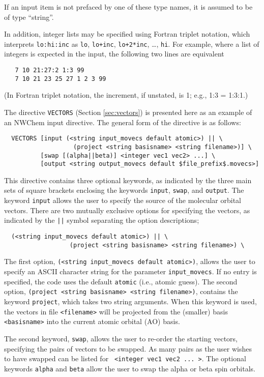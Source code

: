 If an input item is not prefaced by one of these type names,
it is assumed to be of type ``string''.

In addition, integer lists may be specified using Fortran triplet
notation, which interprets \verb+lo:hi:inc+ as \verb+lo+, \verb=lo+inc=,
\verb=lo+2*inc=, \ldots, \verb+hi+.  For example, where a list of
integers is expected in the input, the following two lines are
equivalent
\begin{verbatim}
   7 10 21:27:2 1:3 99
   7 10 21 23 25 27 1 2 3 99
\end{verbatim}
(In Fortran triplet notation,  the increment, if unstated, is 1; e.g., 1:3 = 1:3:1.)
 
The directive \verb+VECTORS+ (Section \ref{sec:vectors}) is presented here
as an example of an NWChem input directive.  The general form of the
directive is as follows:
\begin{verbatim}
  VECTORS [input (<string input_movecs default atomic>) || \
                   (project <string basisname> <string filename>)] \
          [swap [(alpha||beta)] <integer vec1 vec2> ...] \
          [output <string output_movecs default $file_prefix$.movecs>]
\end{verbatim}

This directive contains three optional keywords, as indicated by the 
three main sets of square brackets enclosing the keywords \verb+input+,
\verb+swap+, and \verb+output+.  The keyword \verb+input+ allows the
user to specify the source of the molecular orbital vectors.  
There are two mutually exclusive options for
specifying the vectors, as indicated by the \verb+||+ symbol
separating the option descriptions;
\begin{verbatim}
  (<string input_movecs default atomic>) || \
                  (project <string basisname> <string filename>) \
\end{verbatim}

The first option, \verb+(<string input_movecs default atomic>)+,
allows the user to specify an ASCII character string for the parameter
{\tt input\_movecs}.  If no entry is specified, the code uses the
default \verb+atomic+ (i.e., atomic guess).  The second option,
{\tt(project <string basisname> <string filename>)}, contains the
keyword \verb+project+, which takes two string arguments.  When this
keyword is used, the vectors in file \verb+<filename>+ will be
projected from the (smaller) basis \verb+<basisname>+ into the current
atomic orbital (AO) basis.

The second keyword, \verb+swap+, allows the user to re-order the
starting vectors, specifying the pairs of vectors to be swapped.  As
many pairs as the user wishes to have swapped can be listed for {\tt
  <integer vec1 vec2 ... >}.  The optional keywords \verb+alpha+ and
\verb+beta+ allow the user to swap the alpha or beta spin orbitals.

